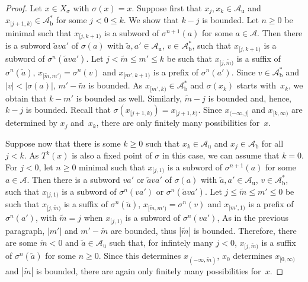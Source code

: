 \documentclass{amsart}
\theoremstyle{definition}
\theoremstyle{remark}
\numberwithin{equation}{section}
\begin{document}
\begin{proof}
Let $x \in X_\sigma$ with $\sigma(x) = x$. 
Suppose first that $x_j, x_k \in \mathcal{A}_\mathrm{u}$ and $x_{[j+1,k)} \in \mathcal{A}_\mathrm{b}^*$ for some $j < 0 \le k$.
We show that $k-j$ is bounded. 
Let $n \ge 0$ be minimal such that $x_{[j,k+1)}$ is a subword of $\sigma^{n+1}(a)$ for some $a \in \mathcal{A}$. 
Then there is a subword $\tilde{a} v a'$ of $\sigma(a)$ with $\tilde{a}, a' \in \mathcal{A}_\mathrm{u}$, $v \in \mathcal{A}_\mathrm{b}^*$, such that $x_{[j,k+1)}$ is a subword of $\sigma^n(\tilde{a} v a')$. 
Let $j < \tilde{m} \le m' \le k$ be such that $x_{[j,\tilde{m})}$ is a suffix of $\sigma^n(\tilde{a})$, $x_{[\tilde{m},m')} = \sigma^n(v)$ and $x_{[m',k+1)}$ is a prefix of $\sigma^n(a')$.
Since $v \in \mathcal{A}_\mathrm{b}^*$ and $|v| < |\sigma(a)|$, $m'-\tilde{m}$ is bounded.
As $x_{[m',k)} \in \mathcal{A}_\mathrm{b}^*$ and $\sigma(x_k)$ starts with~$x_k$, we obtain that $k-m'$ is bounded as well. 
Similarly, $\tilde{m}-j$ is bounded and, hence, $k-j$ is bounded. 
Recall that $\sigma(x_{[j+1,k)}) = x_{[j+1,k)}$. 
Since $x_{(-\infty,j]}$ and $x_{[k,\infty)}$ are determined by $x_j$ and~$x_k$, there are only finitely many possibilities for~$x$. 

Suppose now that there is some $k \ge 0$ such that $x_k \in \mathcal{A}_\mathrm{u}$ and $x_j \in \mathcal{A}_\mathrm{b}$ for all $j < k$. 
As $T^k(x)$ is also a fixed point of $\sigma$ in this case, we can assume that $k = 0$. 
For $j < 0$, let $n \ge 0$ minimal such that $x_{[j,1)}$ is a subword of $\sigma^{n+1}(a)$ for some $a \in \mathcal{A}$. 
Then there is a subword $v a'$ or $\tilde{a} v a'$ of $\sigma(a)$ with $\tilde{a}, a' \in \mathcal{A}_\mathrm{u}$, $v \in \mathcal{A}_\mathrm{b}^*$, such that $x_{[j,1)}$ is a subword of $\sigma^n(v a')$ or $\sigma^n(\tilde{a} v a')$. 
Let $j \le \tilde{m} \le m' \le 0$ be such that $x_{[j,\tilde{m})}$ is a suffix of $\sigma^n(\tilde{a})$, $x_{[\tilde{m},m')} = \sigma^n(v)$ and $x_{[m',1)}$ is a prefix of $\sigma^n(a')$, with $\tilde{m} = j$ when $x_{[j,1)}$ is a subword of $\sigma^n(v a')$,
As in the previous paragraph, $|m'|$ and $m' - \tilde{m}$ are bounded, thus $|\tilde{m}|$ is bounded. 
Therefore, there are some $\tilde{m} < 0$ and $\tilde{a} \in \mathcal{A}_\mathrm{u}$ such that, for infintely many $j<0$, $x_{[j,\tilde{m})}$ is a suffix of $\sigma^n(\tilde{a})$ for some $n \ge 0$.
Since this determines $x_{(-\infty,\tilde{m})}$, $x_0$ determines $x_{[0,\infty)}$ and $|\tilde{m}|$ is bounded, there are again only finitely many possibilities for~$x$. 


\end{proof}
\end{document}
